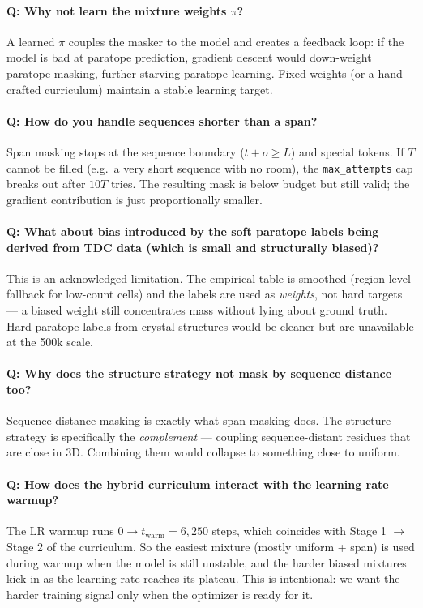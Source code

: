 \documentclass[11pt]{article}
\begin{document}
\paragraph{Q: Why not learn the mixture weights $\pi$?}
A learned $\pi$ couples the masker to the model and creates a
feedback loop: if the model is bad at paratope prediction, gradient
descent would down-weight paratope masking, further starving paratope
learning. Fixed weights (or a hand-crafted curriculum) maintain a
stable learning target.

\paragraph{Q: How do you handle sequences shorter than a span?}
Span masking stops at the sequence boundary ($t + o \ge L$) and
special tokens. If $T$ cannot be filled (e.g.\ a very short sequence
with no room), the \texttt{max\_attempts} cap breaks out after $10T$
tries. The resulting mask is below budget but still valid; the
gradient contribution is just proportionally smaller.

\paragraph{Q: What about bias introduced by the soft paratope labels
being derived from TDC data (which is small and structurally biased)?}
This is an acknowledged limitation. The empirical table is smoothed
(region-level fallback for low-count cells) and the labels are used
as \emph{weights}, not hard targets --- a biased weight still
concentrates mass without lying about ground truth. Hard paratope
labels from crystal structures would be cleaner but are unavailable
at the 500k scale.

\paragraph{Q: Why does the structure strategy not mask by sequence
distance too?}
Sequence-distance masking is exactly what span masking does. The
structure strategy is specifically the \emph{complement} ---
coupling sequence-distant residues that are close in 3D. Combining
them would collapse to something close to uniform.

\paragraph{Q: How does the hybrid curriculum interact with the
learning rate warmup?}
The LR warmup runs $0 \to t_{\text{warm}} = 6{,}250$ steps, which
coincides with Stage 1 $\to$ Stage 2 of the curriculum. So the
easiest mixture (mostly uniform + span) is used during warmup when
the model is still unstable, and the harder biased mixtures kick in
as the learning rate reaches its plateau. This is intentional: we
want the harder training signal only when the optimizer is ready for it.
\end{document}
